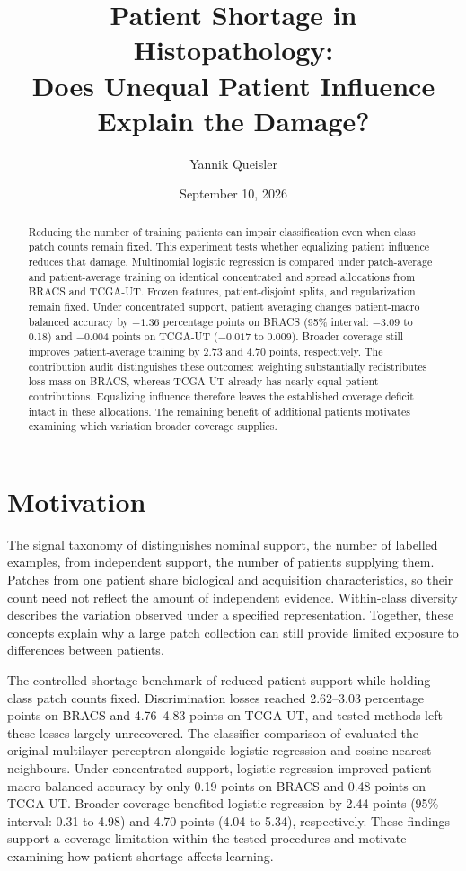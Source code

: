 \documentclass[11pt]{article}
\title{Patient Shortage in Histopathology:\\Does Unequal Patient Influence Explain the Damage?}
\author{Yannik Queisler}
\date{September 10, 2026}
\begin{document}
\raggedbottom
{}
\setlength{\emergencystretch}{2em}
\maketitle
\begin{abstract}
\noindent Reducing the number of training patients can impair classification even when class patch counts remain fixed. This experiment tests whether equalizing patient influence reduces that damage. Multinomial logistic regression is compared under patch-average and patient-average training on identical concentrated and spread allocations from BRACS and TCGA-UT. Frozen features, patient-disjoint splits, and regularization remain fixed. Under concentrated support, patient averaging changes patient-macro balanced accuracy by $-1.36$ percentage points on BRACS (95\% interval: $-3.09$ to 0.18) and $-0.004$ points on TCGA-UT ($-0.017$ to 0.009). Broader coverage still improves patient-average training by 2.73 and 4.70 points, respectively. The contribution audit distinguishes these outcomes: weighting substantially redistributes loss mass on BRACS, whereas TCGA-UT already has nearly equal patient contributions. Equalizing influence therefore leaves the established coverage deficit intact in these allocations. The remaining benefit of additional patients motivates examining which variation broader coverage supplies.
\end{abstract}
\tableofcontents
\clearpage

\section{Motivation}
\label{sec:motivation}
The signal taxonomy of \citet{queisler2026imbalanceMethods} distinguishes nominal support, the number of labelled examples, from independent support, the number of patients supplying them. Patches from one patient share biological and acquisition characteristics, so their count need not reflect the amount of independent evidence. Within-class diversity describes the variation observed under a specified representation. Together, these concepts explain why a large patch collection can still provide limited exposure to differences between patients.

The controlled shortage benchmark of \citet{queisler2026benchmarkResults} reduced patient support while holding class patch counts fixed. Discrimination losses reached 2.62--3.03 percentage points on BRACS and 4.76--4.83 points on TCGA-UT, and tested methods left these losses largely unrecovered. The classifier comparison of \citet{queisler2026patientShortage} evaluated the original multilayer perceptron alongside logistic regression and cosine nearest neighbours. Under concentrated support, logistic regression improved patient-macro balanced accuracy by only 0.19 points on BRACS and 0.48 points on TCGA-UT. Broader coverage benefited logistic regression by 2.44 points (95\% interval: 0.31 to 4.98) and 4.70 points (4.04 to 5.34), respectively. These findings support a coverage limitation within the tested procedures and motivate examining how patient shortage affects learning.
\end{document}
